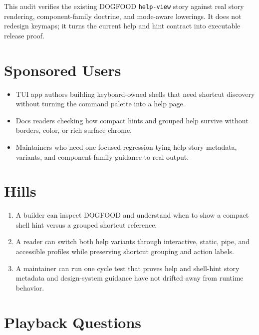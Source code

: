 This audit verifies the existing DOGFOOD \texttt{h\allowbreak{}e\allowbreak{}l\allowbreak{}p\allowbreak{}-\allowbreak{}v\allowbreak{}i\allowbreak{}e\allowbreak{}w} story against real story rendering, component-family doctrine, and mode-aware lowerings. It does not redesign keymaps; it turns the current help and hint contract into executable release proof.

\section{Sponsored Users}\label{record-105-sponsored-users}

\begin{itemize}
\tightlist
\item
  TUI app authors building keyboard-owned shells that need shortcut discovery without turning the command palette into a help page.
\item
  Docs readers checking how compact hints and grouped help survive without borders, color, or rich surface chrome.
\item
  Maintainers who need one focused regression tying help story metadata, variants, and component-family guidance to real output.
\end{itemize}

\section{Hills}\label{record-105-hills}

\begin{enumerate}
\def\labelenumi{\arabic{enumi}.}
\tightlist
\item
  A builder can inspect DOGFOOD and understand when to show a compact shell hint versus a grouped shortcut reference.
\item
  A reader can switch both help variants through interactive, static, pipe, and accessible profiles while preserving shortcut grouping and action labels.
\item
  A maintainer can run one cycle test that proves help and shell-hint story metadata and design-system guidance have not drifted away from runtime behavior.
\end{enumerate}

\section{Playback Questions}\label{record-105-playback-questions}

